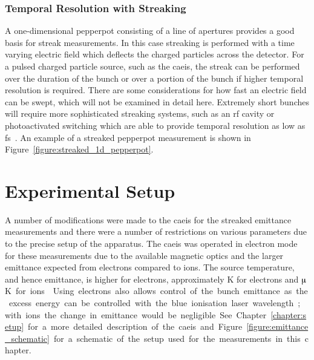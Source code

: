 \subsubsection{Temporal Resolution with Streaking}
A one-dimensional pepperpot consisting of a line of apertures provides a good basis for streak measurements.
In this case streaking is performed with a time varying electric field which deflects the charged particles across the detector.
For a pulsed charged particle source, such as the \gls{caeis}, the streak can be performed over the duration of the bunch or over a portion of the bunch if higher temporal resolution is required.
There are some considerations for how fast an electric field can be swept, which will not be examined in detail here.
Extremely short bunches will require more sophisticated streaking systems, such as an \gls{rf} cavity or photoactivated switching which are able to provide temporal resolution as low as \unit[100]{fs}~\cite{li_note:_2010,kassier_compact_2010,van_rens_theory_2018}.
An example of a streaked pepperpot measurement is shown in Figure~\ref{figure:streaked_1d_pepperpot}.

\section{Experimental Setup}

A number of modifications were made to the \gls{caeis} for the streaked emittance measurements and there were a number of restrictions on various parameters due to the precise setup of the apparatus.
The \gls{caeis} was operated in electron mode for these measurements due to the available magnetic optics and the larger emittance expected from electrons compared to ions.
The source temperature, and hence emittance, is higher for electrons, approximately \unit[10]{K} for electrons and \unit[100]{$\muup$K} for ions~\cite{saliba_spatial_2012}.
Using electrons also allows control of the bunch emittance as the excess energy can be controlled with the blue ionisation laser wavelength; with ions the change in emittance would be negligible.

See Chapter~\ref{chapter:setup} for a more detailed description of the \gls{caeis} and Figure~\ref{figure:emittance_schematic} for a schematic of the setup used for the measurements in this chapter.


